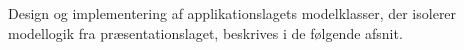 Design og implementering af applikationslagets modelklasser, der isolerer modellogik fra præsentationslaget, beskrives i de følgende afsnit.